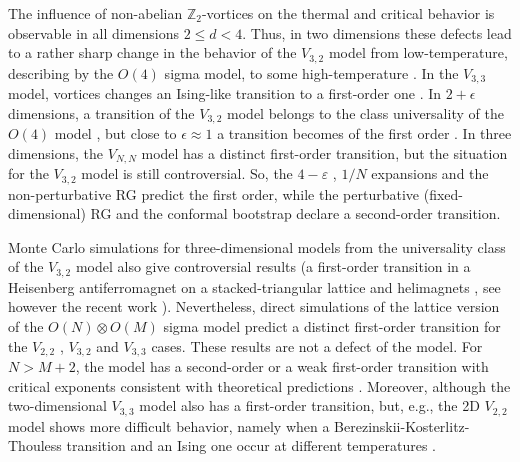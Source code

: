 \documentclass[final,twocolumn]{elsarticle}
\begin{document}
The influence of non-abelian $\mathbb{Z}_2$-vortices on the thermal and critical behavior is observable in all dimensions $2\leq d<4$. Thus, in two dimensions these defects lead to a rather sharp change in the  behavior of the $V_{3,2}$ model from low-temperature, describing by the $O(4)$ sigma model, to some high-temperature \cite{Southern95,Azaria01,Hasselman14,Sorokin19}. In the $V_{3,3}$ model, vortices changes an Ising-like transition to a first-order one \cite{Sorokin17,Sorokin18}. In $2+\epsilon$ dimensions, a transition of the $V_{3,2}$ model belongs to the class universality of the $O(4)$ model \cite{Azaria90,Azaria93,Pelissetto01}, but close to $\epsilon\approx1$ a transition becomes of the first order \cite{Zumbach95}. In three dimensions, the $V_{N,N}$ model has a distinct first-order transition, but the situation for the $V_{3,2}$ model is still controversial. So, the $4-\varepsilon$ \cite{Kawamura90,Sokolov95,Calabrese04,Sokolov20}, $1/N$ \cite{Gracey02,Gracey02-2} expansions and the non-perturbative RG \cite{Zumbach93,Zumbach94,Zumbach94-2,Delamotte00,Delamotte03,Delamotte16} predict the first order, while the perturbative (fixed-dimensional) RG \cite{Sokolov94,Pelissetto01-2,Sokolov02,Sokolov03,Parruccini03,Pelissetto04,Delamotte10} and the conformal bootstrap \cite{Nakayama14,Nakayama15,Henriksson20} declare a second-order transition.

Monte Carlo simulations for three-dimensional models from the universality class of the $V_{3,2}$ model also give controversial results (a first-order transition in a Heisenberg antiferromagnet on a stacked-triangular lattice \cite{Diep08} and helimagnets \cite{Sorokin14}, see however the recent work \cite{Kawamura19}). Nevertheless, direct simulations of the lattice version of the $O(N)\otimes O(M)$ sigma model predict a distinct first-order transition for the $V_{2,2}$ \cite{Kunz93,Loison98}, $V_{3,2}$ \cite{Loison99} and $V_{3,3}$ \cite{Diep94,Loison00} cases. These results are not a defect of the model. For $N>M+2$, the model has a second-order or a weak first-order transition with critical exponents consistent with theoretical predictions \cite{SorokinFut}. Moreover, although the two-dimensional $V_{3,3}$ model also has a first-order transition, but, e.g., the 2D $V_{2,2}$ model shows more difficult behavior, namely when a Berezinskii-Kosterlitz-Thouless transition and an Ising one occur at different temperatures \cite{Sorokin19,Sorokin18}.
\end{document}
